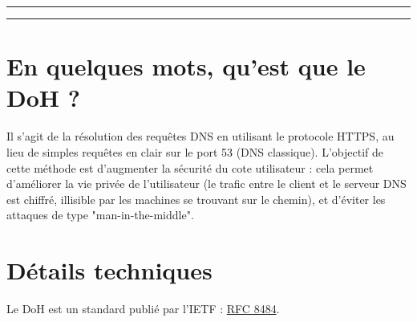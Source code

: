\documentclass[a4paper,12pt]{article}
\begin{document}
\begin{titlepage}
		\vspace{0.1\textheight} %
		
		
		\centering
		
		\rule{\textwidth}{0.4pt} %
		
		\vspace{2pt}\vspace{-\baselineskip} %
		
		\rule{\textwidth}{1pt} %
		
	\end{titlepage}
	
	\setcounter{page}{1}
	
	\hspace{2cm}
	\tableofcontents
	
	\newpage
	
	\section{En quelques mots, qu'est que le DoH ?}
	Il s'agit de la résolution des requêtes DNS en utilisant le protocole HTTPS, au lieu de simples requêtes en clair sur le port 53 (DNS classique). L'objectif de cette méthode est d'augmenter la sécurité du cote utilisateur : cela permet d'améliorer la vie privée de l'utilisateur (le trafic entre le client et le serveur DNS est chiffré, illisible par les machines se trouvant sur le chemin), et d'éviter les attaques de type "man-in-the-middle".
	
	\section{Détails techniques}
	Le DoH est un standard publié par l'IETF : \href{https://tools.ietf.org/html/rfc8484}{RFC 8484}.
	
\end{document}
